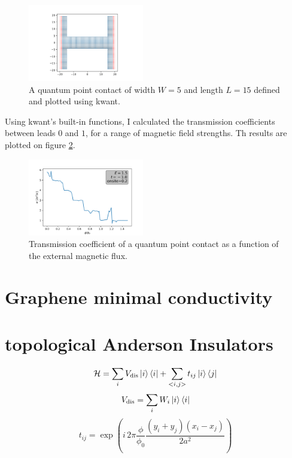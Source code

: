 \documentclass[11pt, a4paper, twocolumn]{article}
\begin{document}
\begin{figure}[H]
  \begin{center}
  \includegraphics[width=0.45\textwidth]{./media/qpc_L15_W5.png}
  \caption{A quantum point contact of width $W=5$ and length $L=15$ defined and plotted using kwant.}
  \label{fig:qpc_L15_W5}
  \end{center}
\end{figure}

Using kwant's built-in functions, I calculated the transmission coefficients between leads $0$
and $1$, for a range of magnetic field strengths. Th results are plotted on figure \ref{fig:qpc_L15_W5_VS0_2_cond_phi_e1_5}.

\begin{figure}[H]
  \begin{center}
  \includegraphics[width=0.45\textwidth]{./media/qpc_L15_W5_VS0_2_cond_phi_e1_5.png}
  \caption{Transmission coefficient of a quantum point contact as a function of the external magnetic flux.}
  \label{fig:qpc_L15_W5_VS0_2_cond_phi_e1_5}
  \end{center}
\end{figure}

\section*{Graphene minimal conductivity}


\section*{topological Anderson Insulators}
\begin{equation*}
  \mathcal H = \sum\limits_i V_{\textrm{dis}}\ket i \bra i + \sum\limits_{<i,j>} t_{ij} \ket i \bra j
\end{equation*}
\begin{equation*}
  V_\text{dis} = \sum_i W_i \ket i \bra i
\end{equation*}
\begin{equation*}
  t_{ij} = \exp\left(i\, 2 \pi \frac{\phi}{\phi_0} \frac{(y_i + y_j)(x_i-x_j)}{2a^2} \right)
\end{equation*}
\end{document}
